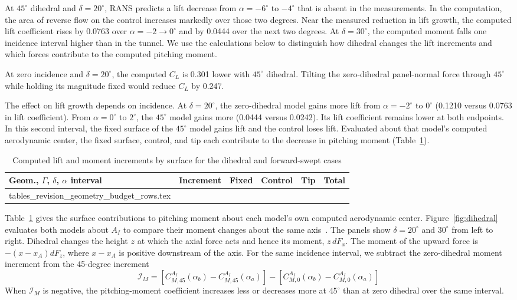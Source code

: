 \documentclass[journal]{new-aiaa}
\makeatletter
\newcommand{\degc}{^\circ}
\newcommand{\tablerows}[1]{\@@input #1.tex }
\makeatother
\begin{document}
At $45\degc$ dihedral and $\delta=20\degc$, RANS predicts a lift decrease from $\alpha=-6\degc$ to $-4\degc$ that is absent in the measurements. In the computation, the area of reverse flow on the control increases markedly over those two degrees. Near the measured reduction in lift growth, the computed lift coefficient rises by 0.0763 over $\alpha=-2\to0\degc$ and by 0.0444 over the next two degrees. At $\delta=30\degc$, the computed moment falls one incidence interval higher than in the tunnel. We use the calculations below to distinguish how dihedral changes the lift increments and which forces contribute to the computed pitching moment.

At zero incidence and $\delta=20\degc$, the computed $C_L$ is 0.301 lower with $45\degc$ dihedral. Tilting the zero-dihedral panel-normal force through $45\degc$ while holding its magnitude fixed would reduce $C_L$ by 0.247.

The effect on lift growth depends on incidence. At $\delta=20\degc$, the zero-dihedral model gains more lift from $\alpha=-2\degc$ to $0\degc$ (0.1210 versus 0.0763 in lift coefficient). From $\alpha=0\degc$ to $2\degc$, the $45\degc$ model gains more (0.0444 versus 0.0242). Its lift coefficient remains lower at both endpoints. In this second interval, the fixed surface of the $45\degc$ model gains lift and the control loses lift. Evaluated about that model's computed aerodynamic center, the fixed surface, control, and tip each contribute to the decrease in pitching moment (Table~\ref{tab:geometry_budget}).

\begin{table}[htbp]\centering\small
\caption{Computed lift and moment increments by surface for the dihedral and forward-swept cases}\label{tab:geometry_budget}
\begin{tabular}{llrrrr}\toprule
Geom., $\Gamma$, $\delta$, $\alpha$ interval & Increment & Fixed & Control & Tip & Total \\\midrule
\tablerows{tables_revision_geometry_budget_rows}
\bottomrule\end{tabular}\end{table}

Table~\ref{tab:geometry_budget} gives the surface contributions to pitching moment about each model's own computed aerodynamic center. Figure~\ref{fig:dihedral} evaluates both models about $A_I$ to compare their moment changes about the same axis~\cite{maggin1946dihedral}. The panels show $\delta=20\degc$ and $30\degc$ from left to right. Dihedral changes the height $z$ at which the axial force acts and hence its moment, $z\,dF_x$. The moment of the upward force is $-(x-x_A)dF_z$, where $x-x_A$ is positive downstream of the axis. For the same incidence interval, we subtract the zero-dihedral moment increment from the 45-degree increment
\begin{equation}
 \mathcal I_M=[C_{M,45}^{A_I}(\alpha_b)-C_{M,45}^{A_I}(\alpha_a)]
             -[C_{M,0}^{A_I}(\alpha_b)-C_{M,0}^{A_I}(\alpha_a)]
\label{eq:interval}
\end{equation}
When $\mathcal I_M$ is negative, the pitching-moment coefficient increases less or decreases more at $45\degc$ than at zero dihedral over the same interval.
\end{document}
